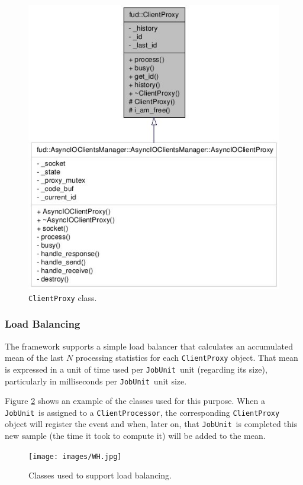 \documentclass[a4paper,12pt,english]{report}
\newcommand{\JU}{\texttt{JobUnit}}
\newcommand{\CP}{\texttt{ClientProcessor}}
\begin{document}
\begin{figure}[!ht]
\begin{center}
\includegraphics [bb= 0 0 237 270]{images/CProxy.jpg}
\end{center}
\caption{\texttt{ClientProxy} class.}
\label{CProxy}
\end{figure}

\subsubsection{Load Balancing}

The framework supports a simple load balancer that calculates an accumulated mean of the last $N$ processing statistics for each \texttt{ClientProxy} object. That mean is expressed in a unit of time used per \JU \ unit (regarding its size), particularly in milliseconds per \JU \ unit size.

Figure \ref{WH} shows an example of the classes used for this purpose. When a \JU \ is assigned to a \CP, the corresponding \texttt{ClientProxy} object will register the event and when, later on, that \JU \ is completed this new sample (the time it took to compute it) will be added to the mean.

\begin{figure}[!ht]
\begin{center}
\texttt{[image: images/WH.jpg]}
\end{center}
\caption{Classes used to support load balancing.}
\label{WH}
\end{figure}
\end{document}
